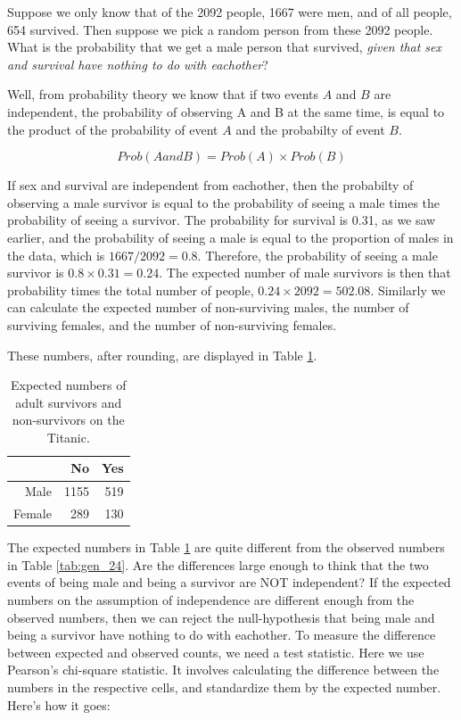 \documentclass[]{book}\usepackage[]{graphicx}\usepackage[]{color}
\begin{document}
Suppose we only know that of the 2092 people, 1667 were men, and of all people, 654 survived. Then suppose we pick a random person from these 2092 people. What is the probability that we get a male person that survived, \textit{given that sex and survival have nothing to do with eachother}?

Well, from probability theory we know that if two events $A$ and $B$ are independent, the probability of observing A and B at the same time, is equal to the product of the probability of event $A$ and the probabilty of event $B$.

\begin{equation}
Prob(A and B) = Prob(A) \times Prob(B)
\end{equation}

If sex and survival are independent from eachother, then the probabilty of observing a male survivor is equal to the probability of seeing a male times the probability of seeing a survivor. The probability for survival is 0.31, as we saw earlier, and the probability of seeing a male is equal to the proportion of males in the data, which is $1667/2092 =0.8$. Therefore, the probability of seeing a male survivor is $0.8 \times 0.31 =0.24 $. The expected number of male survivors is then that probability times the total number of people, $0.24 \times 2092= 502.08$. Similarly we can calculate the expected number of non-surviving males, the number of surviving females, and the number of non-surviving females.


These numbers, after rounding, are displayed in Table \ref{tab:gen_27}.


\begin{table}[ht]
\centering
\caption{Expected numbers of adult survivors and non-survivors on the Titanic.} 
\label{tab:gen_27}
\begin{tabular}{rrr}
  \hline
 & No & Yes \\ 
  \hline
Male & 1155 & 519 \\ 
  Female & 289 & 130 \\ 
   \hline
\end{tabular}
\end{table}



The expected numbers in Table \ref{tab:gen_27} are quite different from the observed numbers in Table \ref{tab:gen_24}. Are the differences large enough to think that the two events of being male and being a survivor are NOT independent? If the expected numbers on the assumption of independence are different enough from the observed numbers, then we can reject the null-hypothesis that being male and being a survivor have nothing to do with eachother. To measure the difference between expected and observed counts, we need a test statistic. Here we use Pearson's chi-square statistic. It involves calculating the difference between the numbers in the respective cells, and standardize them by the expected number. Here's how it goes:
\end{document}
